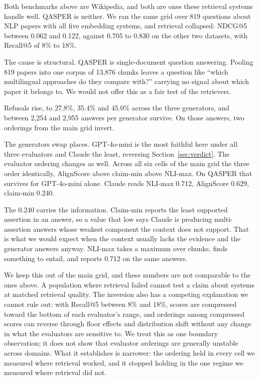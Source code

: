 \documentclass[11pt]{article}
\begin{document}
Both benchmarks above are Wikipedia, and both are ones these retrieval systems handle well. QASPER \citep{dasigi-etal-2021} is neither. We ran the same grid over 819 questions about NLP papers with all five embedding systems, and retrieval collapsed: NDCG@5 between 0.062 and 0.122, against 0.705 to 0.830 on the other two datasets, with Recall@5 of 8\% to 18\%.

The cause is structural. QASPER is single-document question answering. Pooling 819 papers into one corpus of 13,876 chunks leaves a question like ``which multilingual approaches do they compare with?'' carrying no signal about which paper it belongs to. We would not offer this as a fair test of the retrievers.

Refusals rise, to 27.8\%, 35.4\% and 45.0\% across the three generators, and between 2,254 and 2,955 answers per generator survive. On those answers, two orderings from the main grid invert.

The generators swap places. GPT-4o-mini is the most faithful here under all three evaluators and Claude the least, reversing Section~\ref{sec:verdict}. The evaluator ordering changes as well. Across all six cells of the main grid the three order identically, AlignScore above claim-min above NLI-max. On QASPER that survives for GPT-4o-mini alone. Claude reads NLI-max 0.712, AlignScore 0.629, claim-min 0.240.

The 0.240 carries the information. Claim-min reports the least supported assertion in an answer, so a value that low says Claude is producing multi-assertion answers whose weakest component the context does not support. That is what we would expect when the context usually lacks the evidence and the generator answers anyway. NLI-max takes a maximum over chunks, finds something to entail, and reports 0.712 on the same answers.

We keep this out of the main grid, and these numbers are not comparable to the ones above. A population where retrieval failed cannot test a claim about systems at matched retrieval quality. The inversion also has a competing explanation we cannot rule out: with Recall@5 between 8\% and 18\%, scores are compressed toward the bottom of each evaluator's range, and orderings among compressed scores can reverse through floor effects and distribution shift without any change in what the evaluators are sensitive to. We treat this as one boundary observation; it does not show that evaluator orderings are generally unstable across domains. What it establishes is narrower: the ordering held in every cell we measured where retrieval worked, and it stopped holding in the one regime we measured where retrieval did not.
\end{document}

